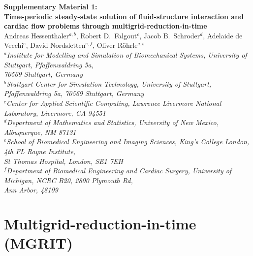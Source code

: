 \documentclass[3p]{elsarticle}
\begin{document}
\begin{center}
        \textbf{\large
    Supplementary Material 1:\\[1ex]
    Time-periodic steady-state solution of fluid-structure interaction and cardiac
flow problems through multigrid-reduction-in-time}\\[3ex]
        Andreas Hessenthaler$^{a,b}$,
    Robert D.\ Falgout$^c$,
    Jacob B.\ Schroder$^d$,
    Adelaide de Vecchi$^e$,
    David Nordsletten$^{e,f}$,
    Oliver R\"ohrle$^{a,b}$\\[2ex]
        {\itshape \footnotesize
    ${}^a$Institute for Modelling and Simulation of Biomechanical Systems,
    University of Stuttgart, Pfaffenwaldring 5a,\\
    70569 Stuttgart, Germany\\
    ${}^b$Stuttgart Center for Simulation Technology, University of Stuttgart,
    Pfaffenwaldring 5a, 70569 Stuttgart, Germany\\
    ${}^c$Center for Applied Scientific Computing, Lawrence Livermore National Laboratory, Livermore, CA 94551\\
    ${}^d$Department of Mathematics and Statistics, University of New Mexico, Albuquerque, NM 87131\\
    ${}^e$School of Biomedical Engineering and Imaging Sciences,
    King's College London, 4th FL Rayne Institute,\\
    St Thomas Hospital, London, SE1 7EH\\
    ${}^f$Department of Biomedical Engineering and Cardiac Surgery,
    University of Michigan,
    NCRC B20, 2800 Plymouth Rd,\\
    Ann Arbor, 48109\\
    }
    \end{center}


\label{online-supplement-sec}

\section{Multigrid-reduction-in-time (MGRIT)}
\label{mgrit-time-grid-hierarchy-suppsec}
\end{document}
